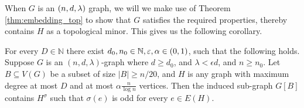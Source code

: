 \documentclass[11pt]{article}
\begin{document}
When $G$ is an $(n, d, \lambda)$ graph, we will we make use of Theorem \ref{thm:embedding_top} to show that $G$ satisfies the required properties, thereby contains $H$ as a topological minor.
This gives us the following corollary.
\begin{corollary} \label{cor:embedding_top}
  For every $D \in \mathbb{N}$ there exist $d_0, n_0 \in \mathbb{N}, \varepsilon, \alpha \in (0,1)$, such that the following holds. 
  Suppose $G$ is an $(n,d,\lambda)$-graph where $d \ge d_0$, and $\lambda < \epsilon d$, and $n \ge n_0$. 
  Let $B \subseteq V(G)$ be a subset of size $|B| \ge n/20$, and $H$ is any graph with maximum degree at most $D$ and at most $\alpha \frac{n}{\log n}$ vertices.
Then the induced sub-graph $G[B]$ contains $H^{\sigma}$ such that $\sigma(e)$ is odd for every $e \in E(H)$.
\end{corollary}
\end{document}
